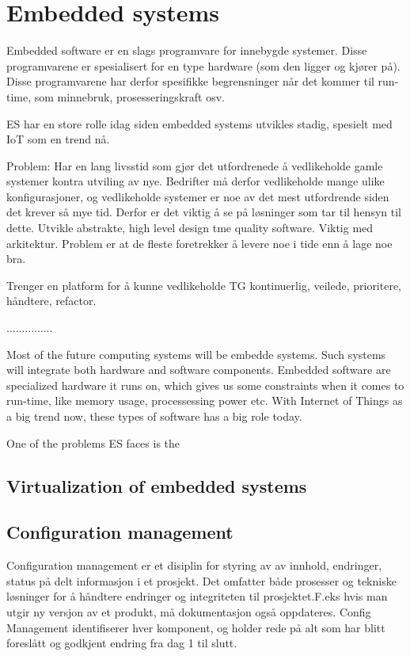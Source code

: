 \section{Embedded systems}
Embedded software er en slags programvare for innebygde systemer. Disse programvarene er spesialisert for en type hardware (som den ligger og kjører på). Disse programvarene har derfor spesifikke begrensninger når det kommer til run-time, som minnebruk, prosesseringskraft osv.

ES har en store rolle idag siden embedded systems utvikles stadig, spesielt med IoT som en trend nå.

Problem: Har en lang livsstid som gjør det utfordrenede å vedlikeholde gamle systemer kontra utviling av nye. Bedrifter må derfor vedlikeholde mange ulike konfigurasjoner, og vedlikeholde systemer er noe av det mest utfordrende siden det krever så mye tid. Derfor er det viktig å se på løsninger som tar til hensyn til dette. Utvikle abstrakte, high level design tme quality software. Viktig med arkitektur. Problem er at de fleste foretrekker å levere noe i tide enn å lage noe bra.

Trenger en platform for å kunne vedlikeholde TG kontinuerlig, veilede, prioritere, håndtere, refactor.


...............

Most of the future computing systems will be embedde systems. Such systems will integrate both hardware and software components\cite{wolfmadsen-2000}. Embedded software are specialized hardware it runs on, which gives us some constraints when it comes to run-time, like memory usage, processessing power etc. With Internet of Things as a big trend now, these types of software has a big role today. 

One of the problems ES faces is the 

\subsection{Virtualization of embedded systems}


\subsection{Configuration management}
Configuration management er et disiplin for styring av av innhold, endringer, status på delt informasjon i et prosjekt. Det omfatter både prosesser og tekniske løsninger for å håndtere endringer og integriteten til prosjektet.F.eks hvis man utgir ny versjon av et produkt, må dokumentasjon også oppdateres. Config Management identifiserer hver komponent, og holder rede på alt som har blitt foreslått og godkjent endring fra dag 1 til slutt.

